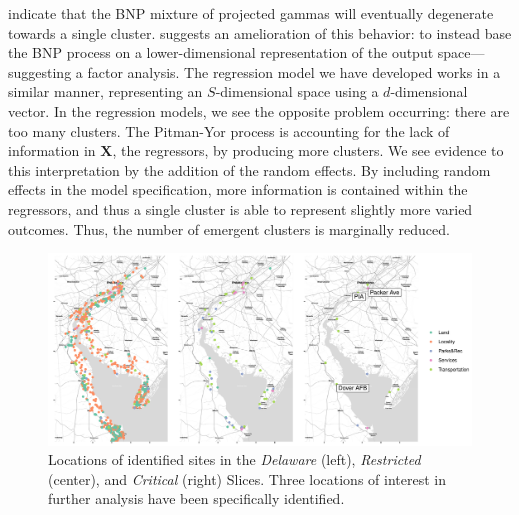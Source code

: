     indicate that the BNP mixture of projected gammas will eventually degenerate towards a 
    single cluster.
    \cite{chandra2023} suggests an amelioration of this behavior: to instead base the 
    BNP process on a lower-dimensional representation of the output space---suggesting 
    a factor analysis.  The regression model we have developed works in a similar manner, 
    representing an $S$-dimensional space using a $d$-dimensional vector.  In the regression
    models, we see the opposite problem occurring: there are too many clusters.  The Pitman-Yor
    process is accounting for the lack of information in $\bm{X}$, the regressors, by producing
    more clusters.  We see evidence to this interpretation by the addition of the random 
    effects.  By including random effects in the model specification, more information is 
    contained within the regressors, and thus a single cluster is able to represent slightly 
    more varied outcomes.  Thus, the number of emergent clusters is marginally reduced.

\begin{figure}[ht]
    \centering
    \includegraphics[width=0.99\linewidth]{./plots/delaware}
    \caption{Locations of identified sites in the \emph{Delaware} (left), 
    \emph{Restricted} (center), and \emph{Critical} (right) Slices.  
    Three locations of interest in further analysis have been specifically identified.
    \label{map:delawarebay}}
\end{figure}

